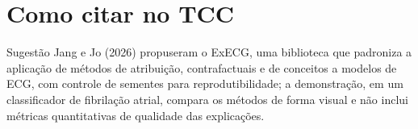 \documentclass[11pt,a4paper]{article}
\begin{document}
\section{Como citar no TCC}
\begin{infobox}[ok]{Sugestão}
Jang e Jo (2026) propuseram o ExECG, uma biblioteca que padroniza a aplicação de métodos de atribuição, contrafactuais e de conceitos a modelos de ECG, com controle de sementes para reprodutibilidade; a demonstração, em um classificador de fibrilação atrial, compara os métodos de forma visual e não inclui métricas quantitativas de qualidade das explicações.
\end{infobox}
\end{document}
